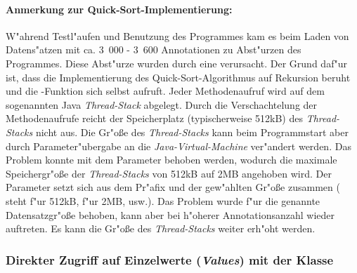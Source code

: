 \paragraph[{Anmerkung zur Quick-Sort-Implementierung}]{Anmerkung zur Quick-Sort-Implementierung:}

W"ahrend Testl"aufen und Benutzung des Programmes kam es beim Laden von Datens"atzen mit ca. \unit{3.000} - \unit{3.600} Annotationen zu Abst"urzen des Programmes.
Diese Abst"urze wurden durch eine  verursacht.
Der Grund daf"ur ist, dass die Implementierung des Quick-Sort-Algorithmus auf Rekursion beruht und die -Funktion sich selbst aufruft.
Jeder Methodenaufruf wird auf dem sogenannten Java \emph{Thread-Stack} abgelegt.
Durch die Verschachtelung der Methodenaufrufe reicht der Speicherplatz (typischerweise \unit{512}{kB}) des \emph{Thread-Stacks} nicht aus.
Die Gr"o{\ss}e des \emph{Thread-Stacks} kann beim Programmstart aber durch Parameter"ubergabe an die \emph{Java-Virtual-Machine} ver"andert werden.
Das Problem konnte mit dem Parameter  behoben werden, wodurch die maximale Speichergr"o{\ss}e der \emph{Thread-Stacks} von \unit{512}{kB} auf \unit{2}{MB} angehoben wird.
Der Parameter setzt sich aus dem Pr"afix  und der gew"ahlten Gr"o{\ss}e zusammen ( steht f"ur \unit{512}{kB},  f"ur \unit{2}{MB}, usw.).
Das Problem wurde f"ur die genannte Datensatzgr"o{\ss}e behoben, kann aber bei h"oherer Annotationsanzahl wieder auftreten.
Es kann die Gr"o{\ss}e des \emph{Thread-Stacks} weiter erh"oht werden.


\subsubsection{Direkter Zugriff auf Einzelwerte (\emph{Values}) mit der Klasse }
\label{sec:bufferd_value_controller}

